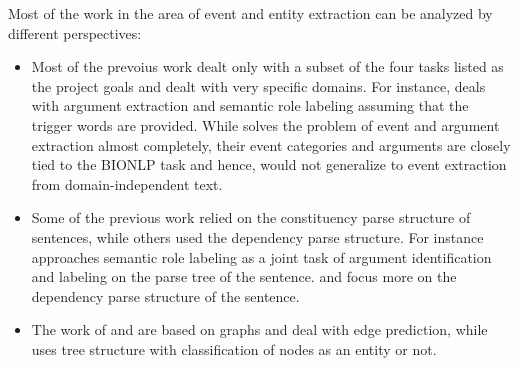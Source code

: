 Most of the work in the area of event and entity extraction can be analyzed by different perspectives:

\begin{itemize}

\item {} Most of the prevoius work dealt only with a subset of the four tasks listed as the project goals and dealt with very specific domains. For instance, \citeauthor{toutanova} deals with argument extraction and semantic role labeling assuming that the trigger words are provided. While \citeauthor{bjorne} solves the problem of event and argument extraction almost completely, their event categories and arguments are closely tied to the BIONLP task and hence, would not generalize to event extraction from domain-independent text.

\item {} Some of the previous work relied on the constituency parse structure of sentences, while others used the dependency parse structure. For instance \citeauthor{toutanova} approaches semantic role labeling as a joint task of argument identification and labeling on the parse tree of the sentence. \citeauthor{bjorne} and \citeauthor{mcclosky} focus more on the dependency parse structure of the sentence.

\item {} The work of \citeauthor{bjorne} and \citeauthor{mcclosky} are based on graphs and deal with edge prediction, while \citeauthor{toutanova} uses tree structure with classification of nodes as an entity or not.

\end{itemize}